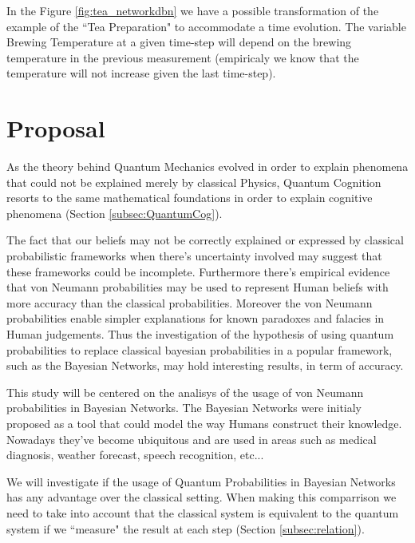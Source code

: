 \documentclass{llncs} %
\begin{document}
In the Figure \ref{fig:tea_networkdbn} we have a possible transformation of the example of the ``Tea Preparation" to accommodate a time evolution. The variable Brewing Temperature at a given time-step will depend on the brewing temperature in the previous measurement (empiricaly we know that the temperature will not increase given the last time-step). 


\section{Proposal}
As the theory behind Quantum Mechanics evolved in order to explain phenomena that could not be explained merely by classical Physics, Quantum Cognition resorts to the same mathematical foundations in order to explain cognitive phenomena (Section \ref{subsec:QuantumCog}). 

The fact that our beliefs may not be correctly explained or expressed by classical probabilistic frameworks when there's uncertainty involved may suggest that these frameworks could be incomplete. Furthermore there's empirical evidence that von Neumann probabilities may be used to represent Human beliefs with more accuracy than the classical probabilities\cite{Busemeyer2011}\cite{Busemeyer2009423}. Moreover the von Neumann probabilities enable simpler explanations for known paradoxes and falacies in Human judgements. Thus the investigation of the hypothesis of using quantum probabilities to replace classical bayesian probabilities in a popular framework, such as the Bayesian Networks, may hold interesting results, in term of accuracy. 

This study will be centered on the analisys of the usage of von Neumann probabilities in Bayesian Networks. The Bayesian Networks were initialy proposed\cite{Pearl1985} as a tool that could model the way Humans construct their knowledge. Nowadays they've become ubiquitous and are used in areas such as medical diagnosis, weather forecast, speech recognition, etc... 

We will investigate if the usage of Quantum Probabilities in Bayesian Networks has any advantage over the classical setting. When making this comparrison we need to take into account that the classical system is equivalent to the quantum system if we ``measure" the result at each step (Section \ref{subsec:relation}). 
\end{document}
